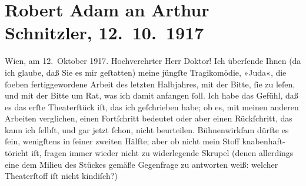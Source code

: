 

         \newcommand{\erwaehnteInstitutionen}{Institutionen: Burgtheater, Königliche Hof- und Nationaltheater München}
         \newcommand{\erwaehnteOrte}{Orte: Wien}
         \newcommand{\erwaehnteWerke}{Werke: Das Ende des Judas}
               \section[Robert Adam an Arthur Schnitzler, 12. 10. 1917]{ Robert Adam an Arthur Schnitzler, 12. 10. 1917}\nopagebreak{}\rehead{ }\begin{ledgroupsized}[t]{13cm}\normalsize\beginnumbering \toendnotes[C]{\smallbreak\pagebreak[2]} 
\pstart
           \raggedleft{}{\pb}Wien, am 12. Oktober
                        1917.\pend
           \pstart{}Hochverehrter Herr Doktor!\pend\pstart
           Ich überſende Ihnen (da ich glaube, daß Sie es mir geſtatten) meine jüngſte
                    Tragikomödie, »Juda«, die ſoeben
                    fertiggewordene Arbeit des letzten Halbjahres, mit der Bitte, ſie zu leſen, und
                    mit der Bitte um Rat, was ich damit anfangen ſoll. Ich habe das Gefühl, daß es
                    das erſte Theaterſtück iſt, das ich geſchrieben habe; ob es, mit meinen anderen
                    Arbeiten verglichen, einen Fortſchritt bedeutet oder aber einen Rückſchritt, das
                    kann ich ſelbſt, und gar jetzt ſchon, nicht beurteilen. Bühnenwirkſam dürfte es
                    ſein, wenigſtens in ſeiner zweiten Hälfte; aber ob nicht mein Stoff {\pb}knabenhaft-töricht iſt, fragen immer wieder
                    nicht zu widerlegende Skrupel (denen allerdings eine dem Milieu des Stückes
                    gemäße Gegenfrage zu antworten weiß: welcher Theaterſtoff iſt nicht kindiſch?)

\end{ledgroupsized}
